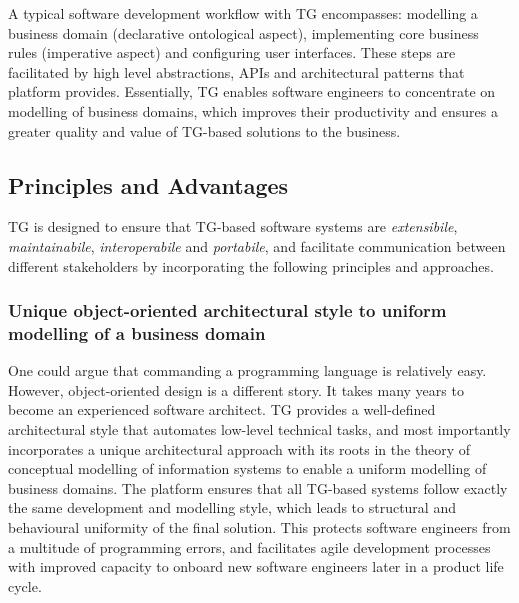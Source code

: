 \documentclass[a4paper,10pt,twocolumn,oneside,openright,final]{memoir}
\begin{document}
  \noindent A typical software development workflow with TG encompasses: modelling a business domain (declarative ontological aspect), implementing core business rules (imperative aspect) and configuring user interfaces.
  These steps are facilitated by high level abstractions, APIs and architectural patterns that platform provides.
  Essentially, TG enables software engineers to concentrate on modelling of business domains, which improves their productivity and ensures a greater quality and value of TG-based solutions to the business.


 \subsection*{Principles and Advantages}
  	TG is designed to ensure that TG-based software systems are \emph{extensibile}, \emph{maintainabile}, \emph{interoperabile} and \emph{portabile}, and facilitate communication between different stakeholders by incorporating the following principles and approaches.

\subsubsection*{Unique object-oriented architectural style to uniform modelling of a business domain}
	One could argue that commanding a programming language is relatively easy. 
  	However, object-oriented design is a different story.
  	It takes many years to become an experienced software architect.
  	TG provides a well-defined architectural style that automates low-level technical tasks, and most importantly incorporates a unique architectural approach with its roots in the theory of conceptual modelling of information systems to enable a uniform modelling of business domains.
	The platform ensures that all TG-based systems follow exactly the same development and modelling style, which leads to structural and behavioural uniformity of the final solution.
  	This protects software engineers from a multitude of programming errors, and facilitates agile development processes with improved capacity to onboard new software engineers later in a product life cycle.
\end{document}
